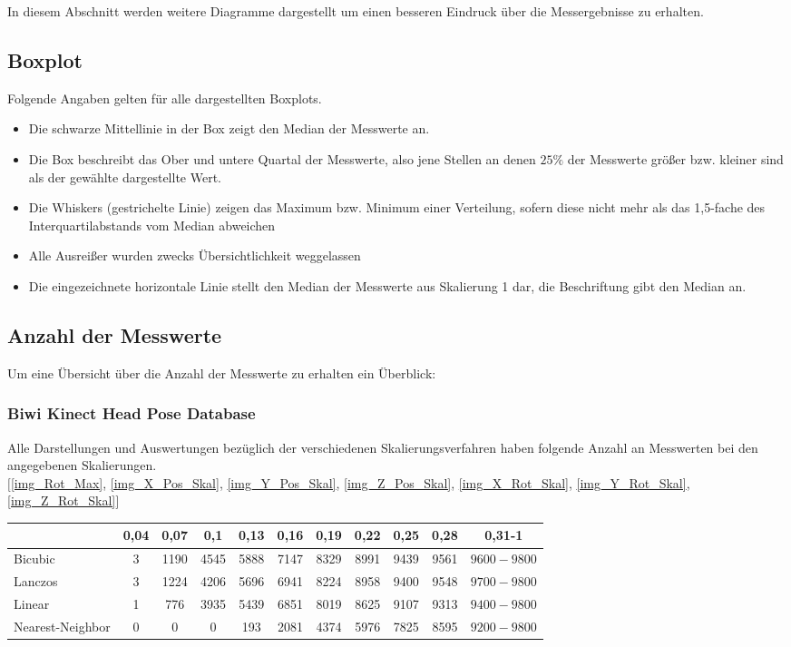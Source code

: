 \label{Abbildungen}
In diesem Abschnitt werden weitere Diagramme dargestellt um einen besseren Eindruck über die Messergebnisse zu erhalten.
\subsection*{Boxplot}
Folgende Angaben gelten für alle dargestellten Boxplots.
\begin{itemize}
	\item Die schwarze Mittellinie in der Box zeigt den Median der Messwerte an.
	\item Die Box beschreibt das Ober und untere Quartal der Messwerte, also jene Stellen an denen $25\%$ der Messwerte größer bzw. kleiner sind als der gewählte dargestellte Wert.
	\item \glqq Die Whiskers (gestrichelte Linie) zeigen das Maximum bzw. Minimum einer Verteilung, sofern diese nicht mehr als das 1,5-fache des Interquartilabstands vom Median abweichen\grqq 
	\cite{wiki_Boxplot}
	\item Alle Ausreißer wurden zwecks Übersichtlichkeit weggelassen
	\item Die eingezeichnete horizontale Linie stellt den Median der Messwerte aus Skalierung 1 dar, die Beschriftung gibt den Median an.
\end{itemize}
\subsection*{Anzahl der Messwerte}
Um eine Übersicht über die Anzahl der Messwerte zu erhalten ein Überblick:
\subsubsection*{Biwi Kinect Head Pose Database}
Alle Darstellungen und Auswertungen bezüglich der verschiedenen Skalierungsverfahren haben folgende Anzahl an Messwerten bei den angegebenen Skalierungen.\\
$[$\autoref{img_Rot_Max}, \autoref{img_X_Pos_Skal}, \autoref{img_Y_Pos_Skal}, \autoref{img_Z_Pos_Skal}, \autoref{img_X_Rot_Skal}, \autoref{img_Y_Rot_Skal}, \autoref{img_Z_Rot_Skal}$]$\\
\begin{tabular}{|l|c|c|c|c|c|c|c|c|c|c|}
	\hline 
	&0,04&0,07&0,1&0,13&0,16&0,19&0,22&0,25&0,28&0,31-1\\
	\hline 
	Bicubic&3&1190&4545&5888&7147&8329&8991&9439&9561&$9600-9800$\\
	\hline 
	Lanczos&3&1224&4206&5696&6941&8224&8958&9400&9548&$9700-9800$\\
	\hline 
	Linear&1&776&3935&5439&6851&8019&8625&9107&9313&$9400-9800$\\
	\hline 
	Nearest-Neighbor&0&0&0&193&2081&4374&5976&7825&8595&$9200-9800$\\ 
	\hline 
\end{tabular} 
